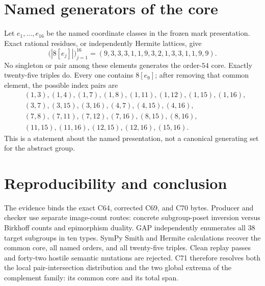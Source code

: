 \documentclass[10pt]{article}
\begin{document}
\section{Named generators of the core}
Let $e_1,\ldots,e_{16}$ be the named coordinate classes in the frozen mark
presentation.  Exact rational residues, or independently Hermite lattices,
give
\[
 \bigl(|8[e_j]|\bigr)_{j=1}^{16}
 =(9,3,3,3,1,1,9,3,2,1,3,3,1,1,9,9).
\]
No singleton or pair among these elements generates the order-$54$ core.
Exactly twenty-five triples do.  Every one contains $8[e_9]$; after removing
that common element, the possible index pairs are
\[
\begin{split}
&(1,3),(1,4),(1,7),(1,8),(1,11),(1,12),(1,15),(1,16),\\
&(3,7),(3,15),(3,16),(4,7),(4,15),(4,16),\\
&(7,8),(7,11),(7,12),(7,16),(8,15),(8,16),\\
&(11,15),(11,16),(12,15),(12,16),(15,16).
\end{split}
\]
This is a statement about the named presentation, not a canonical generating
set for the abstract group.

\section{Reproducibility and conclusion}
The evidence binds the exact C64, corrected C69, and C70 bytes.  Producer and
checker use separate image-count routes: concrete subgroup-poset inversion
versus Birkhoff counts and epimorphism duality.  GAP independently enumerates
all 38 target subgroups in ten types.  SymPy Smith and Hermite calculations
recover the common core, all named orders, and all twenty-five triples.  Clean
replay passes and forty-two hostile semantic mutations are rejected.  C71
therefore resolves both the local pair-intersection distribution and the two
global extrema of the complement family: its common core and its total span.
\end{document}
